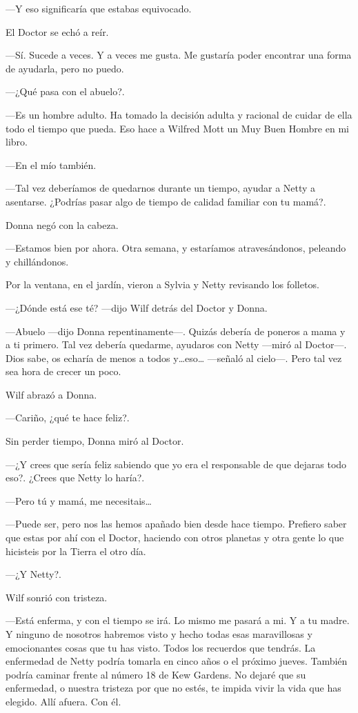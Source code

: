 ---Y eso significaría que estabas equivocado.

El Doctor se echó a reír.

---Sí. Sucede a veces. Y a veces me gusta. Me gustaría poder encontrar
una forma de ayudarla, pero no puedo.

---¿Qué pasa con el abuelo?.

---Es un hombre adulto. Ha tomado la decisión adulta y racional de
cuidar de ella todo el tiempo que pueda. Eso hace a Wilfred Mott un Muy
Buen Hombre en mi libro.

---En el mío también.

---Tal vez deberíamos de quedarnos durante un tiempo, ayudar a Netty a
asentarse. ¿Podrías pasar algo de tiempo de calidad familiar con tu
mamá?.

Donna negó con la cabeza.

---Estamos bien por ahora. Otra semana, y estaríamos atravesándonos,
peleando y chillándonos.

Por la ventana, en el jardín, vieron a Sylvia y Netty revisando los
folletos.

---¿Dónde está ese té? ---dijo Wilf detrás del Doctor y Donna.

---Abuelo ---dijo Donna repentinamente---. Quizás debería de poneros a
mama y a ti primero. Tal vez debería quedarme, ayudaros con Netty
---miró al Doctor---. Dios sabe, os echaría de menos a todos
y\ldots{}eso\ldots{} ---señaló al cielo---. Pero tal vez sea hora de
crecer un poco.

Wilf abrazó a Donna.

---Cariño, ¿qué te hace feliz?.

Sin perder tiempo, Donna miró al Doctor.

---¿Y crees que sería feliz sabiendo que yo era el responsable de que
dejaras todo eso?. ¿Crees que Netty lo haría?.

---Pero tú y mamá, me necesitais\ldots{}

---Puede ser, pero nos las hemos apañado bien desde hace tiempo.
Prefiero saber que estas por ahí con el Doctor, haciendo con otros
planetas y otra gente lo que hicisteis por la Tierra el otro día.

---¿Y Netty?.

Wilf sonrió con tristeza.

---Está enferma, y con el tiempo se irá. Lo mismo me pasará a mi. Y a
tu madre. Y ninguno de nosotros habremos visto y hecho todas esas
maravillosas y emocionantes cosas que tu has visto. Todos los recuerdos
que tendrás. La enfermedad de Netty podría tomarla en cinco años o el
próximo jueves. También podría caminar frente al número 18 de Kew
Gardens. No dejaré que su enfermedad, o nuestra tristeza por que no
estés, te impida vivir la vida que has elegido. Allí afuera. Con él.

